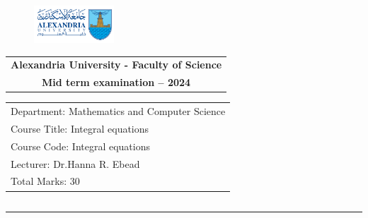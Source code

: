 \documentclass[11pt,a4paper]{article}
\begin{document}
\thispagestyle{empty}
\begin{figure}[t]
    \includegraphics[width=3cm]{collagelogo.png}
    \centering
\end{figure}
\begin{center}

    \begin{tabular}{@{}c@{}}
        \bfseries Alexandria University - Faculty of Science \\
        \bfseries Mid term examination -- 2024               \\
    \end{tabular}
\end{center}

\begin{tabular}[t]{@{}l@{}}%
    Department: Mathematics and Computer Science \\
    Course Title:  Integral equations            \\
    Course Code:  Integral equations             \\
    Lecturer: Dr.Hanna R. Ebead                  \\
    Total Marks: 30                              \\
\end{tabular}%
\begin{tabular}[t]{@{}l@{}}
\end{tabular}
\hrule









\end{document}
